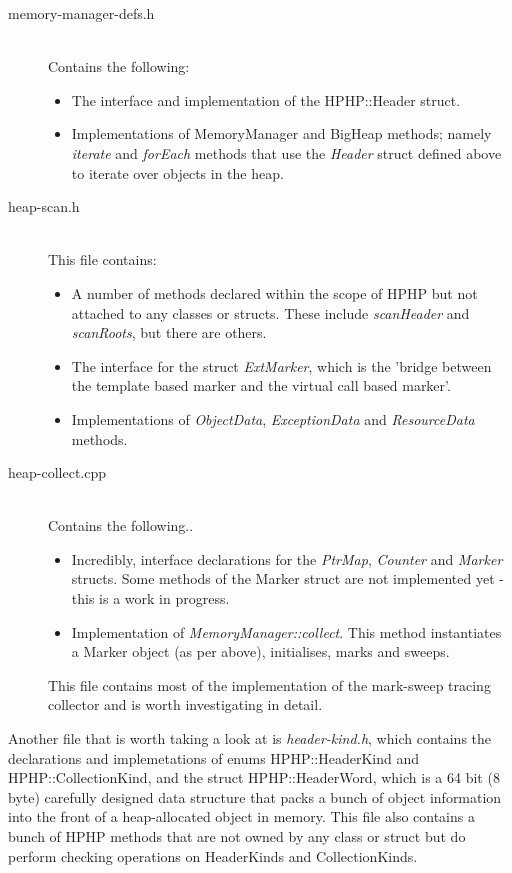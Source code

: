 \begin{description}
  \item[memory-manager-defs.h] \hfill \\
    Contains the following:
    \begin{itemize}
      \item The interface and implementation of the HPHP::Header struct.
      \item Implementations of MemoryManager and BigHeap methods; namely \emph{iterate} and \emph{forEach} methods that use the \emph{Header} struct defined above to iterate over objects in the heap.
    \end{itemize}

  \item[heap-scan.h] \hfill \\
    This file contains:
    \begin{itemize}
      \item A number of methods declared within the scope of HPHP but not attached to any classes or structs. These include \emph{scanHeader} and \emph{scanRoots}, but there are others.
      \item The interface for the struct \emph{ExtMarker}, which is the 'bridge between the template based marker and the virtual call based marker'.
      \item Implementations of \emph{ObjectData}, \emph{ExceptionData} and \emph{ResourceData} methods.
    \end{itemize}

  \item[heap-collect.cpp] \hfill \\
    Contains the following..
    \begin{itemize}
      \item Incredibly, interface declarations for the \emph{PtrMap}, \emph{Counter} and \emph{Marker} structs. Some methods of the Marker struct are not implemented yet - this is a work in progress.
      \item Implementation of \emph{MemoryManager::collect}. This method instantiates a Marker object (as per above), initialises, marks and sweeps.
    \end{itemize}
    This file contains most of the implementation of the mark-sweep tracing collector and is worth investigating in detail.
\end{description}

Another file that is worth taking a look at is \emph{header-kind.h}, which contains the declarations and implemetations of enums HPHP::HeaderKind and HPHP::CollectionKind, and the struct HPHP::HeaderWord, which is a 64 bit (8 byte) carefully designed data structure that packs a bunch of object information into the front of a heap-allocated object in memory. This file also contains a bunch of HPHP methods that are not owned by any class or struct but do perform checking operations on HeaderKinds and CollectionKinds.


